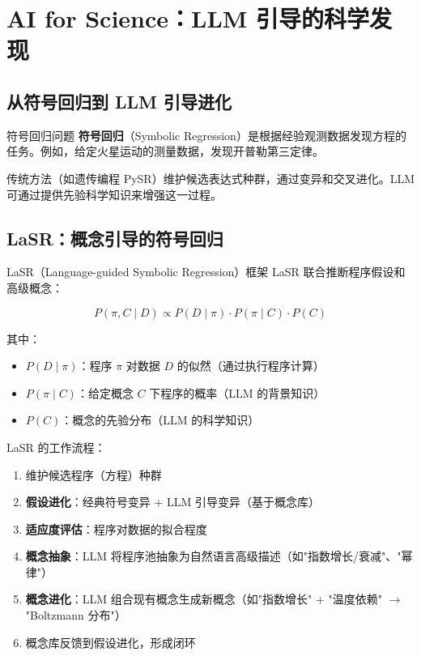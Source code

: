 \section{AI for Science：LLM 引导的科学发现}

\subsection{从符号回归到 LLM 引导进化}

\begin{knowledgebox}{符号回归问题}
\textbf{符号回归}（Symbolic Regression）是根据经验观测数据发现方程的任务。例如，给定火星运动的测量数据，发现开普勒第三定律。

传统方法（如遗传编程 PySR）维护候选表达式种群，通过变异和交叉进化。LLM 可通过提供先验科学知识来增强这一过程。
\end{knowledgebox}

\subsection{LaSR：概念引导的符号回归}

\begin{importantbox}{LaSR（Language-guided Symbolic Regression）框架}
LaSR 联合推断程序假设和高级概念：

$$P(\pi, C \mid D) \propto P(D \mid \pi) \cdot P(\pi \mid C) \cdot P(C)$$

其中：
\begin{itemize}
    \item $P(D \mid \pi)$：程序 $\pi$ 对数据 $D$ 的似然（通过执行程序计算）
    \item $P(\pi \mid C)$：给定概念 $C$ 下程序的概率（LLM 的背景知识）
    \item $P(C)$：概念的先验分布（LLM 的科学知识）
\end{itemize}
\end{importantbox}

LaSR 的工作流程：
\begin{enumerate}
    \item 维护候选程序（方程）种群
    \item \textbf{假设进化}：经典符号变异 + LLM 引导变异（基于概念库）
    \item \textbf{适应度评估}：程序对数据的拟合程度
    \item \textbf{概念抽象}：LLM 将程序池抽象为自然语言高级描述（如"指数增长/衰减"、"幂律"）
    \item \textbf{概念进化}：LLM 组合现有概念生成新概念（如"指数增长" + "温度依赖" $\to$ "Boltzmann 分布"）
    \item 概念库反馈到假设进化，形成闭环
\end{enumerate}

